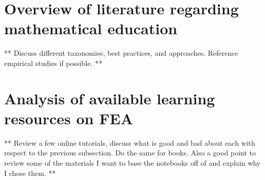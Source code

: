 \section{Overview of literature regarding mathematical education}

** Discuss different taxonomies, best practices, and approaches. Reference empirical studies if possible. **

\section{Analysis of available learning resources on FEA}

** Review a few online tutorials, discuss what is good and bad about each with respect to the previous subsection. Do the same for books. Also a good point to review some of the materials I want to base the notebooks off of and explain why I chose them. **
